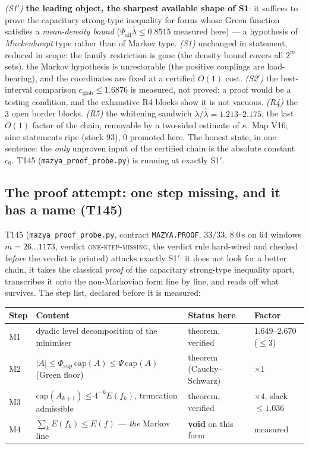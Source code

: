 \documentclass[11pt,a4paper]{article}
\begin{document}
\begin{keybox}
\emph{(S1$'$)} \textbf{the leading object, the sharpest available shape of S1}: it suffices to
prove the capacitary strong-type inequality for forms whose Green function satisfies a
\emph{mean-density bound} ($\Psi_{\mathrm{all}}\hat\lambda\le0.8515$ measured here) --- a
hypothesis of \emph{Muckenhoupt} type rather than of Markov type. \emph{(S1)} unchanged in
statement, reduced in scope: the family restriction is gone (the density bound covers all
$2^m$ sets), the Markov hypothesis is unrestorable (the positive couplings are load-bearing),
and the coordinates are fixed at a certified $O(1)$ cost. \emph{(S2$'$)} the best-interval
comparison $c_{\mathrm{glob}}\le1.6876$ is measured, not proved; a proof would be a testing
condition, and the exhaustive R4 blocks show it is not vacuous. \emph{(R4)} the $3$ open border
blocks. \emph{(R5)} the whitening sandwich $\lambda/\hat\lambda=1.213$--$2.175$, the last
$O(1)$ factor of the chain, removable by a two-sided estimate of $\kappa$. Map V16; nine
statements ripe (stock $93$), $0$ promoted here. The honest state, in one sentence: the
\emph{only} unproven input of the certified chain is the absolute constant $c_0$. T145
(\texttt{mazya\_proof\_probe.py}) is running at exactly S1$'$.
\end{keybox}

\subsection{The proof attempt: one step missing, and it has a name (T145)}
T145 (\texttt{mazya\_proof\_probe.py}, contract \texttt{MAZYA.PROOF}, $33/33$, $8.0$\,s on $64$
windows $m=26\ldots1173$, verdict \textsc{one-step-missing}, the verdict rule hard-wired and
checked \emph{before} the verdict is printed) attacks exactly S1$'$: it does not look for a
better chain, it takes the classical \emph{proof} of the capacitary strong-type inequality
apart, transcribes it onto the non-Markovian form line by line, and reads off what survives.
The step list, declared before it is measured:

\begin{center}\small
\begin{tabularx}{\linewidth}{@{}l Y l l@{}}
\toprule
\textbf{Step} & \textbf{Content} & \textbf{Status here} & \textbf{Factor}\\
\midrule
M1 & dyadic level decomposition of the minimiser & theorem, verified & $1.649$--$2.670$ ($\le3$)\\
M2 & $|A|\le\Phi_{\sup}\,\mathrm{cap}(A)\le\Psi\,\mathrm{cap}(A)$ (Green floor) & theorem (Cauchy--Schwarz) & $\times1$\\
M3 & $\mathrm{cap}(A_{k+1})\le4^{-k}E(f_k)$, truncation admissible & theorem, verified & $\times4$, slack $\le1.036$\\
M4 & $\sum_kE(f_k)\le E(f)$ --- \emph{the} Markov line & \textbf{void} on this form & measured\\
\bottomrule
\end{tabularx}
\end{center}
\end{document}
